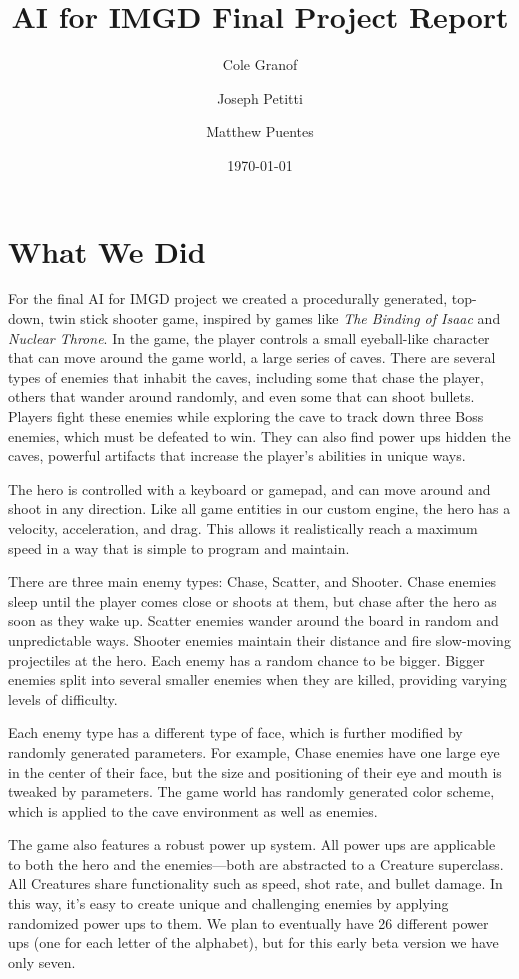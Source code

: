 \documentclass[a4paper, 12pt]{article}
\title{AI for IMGD Final Project Report}
\author{Cole Granof \and Joseph Petitti \and Matthew Puentes}
\date{\today}
\begin{document}
\maketitle

\section{What We Did}

For the final AI for IMGD project we created a procedurally generated, top-down,
twin stick shooter game, inspired by games like \textit{The Binding of Isaac}
and \textit{Nuclear Throne}. In the game, the player controls a small
eyeball-like character that can move around the game world, a large series of
caves. There are several types of enemies that inhabit the caves, including some
that chase the player, others that wander around randomly, and even some that
can shoot bullets. Players fight these enemies while exploring the cave to track
down three Boss enemies, which must be defeated to win. They can also find power
ups hidden the caves, powerful artifacts that increase the player's abilities in
unique ways.

The hero is controlled with a keyboard or gamepad, and can move around and shoot
in any direction. Like all game entities in our custom engine, the hero has a
velocity, acceleration, and drag. This allows it realistically reach a maximum
speed in a way that is simple to program and maintain.

There are three main enemy types: Chase, Scatter, and Shooter. Chase enemies
sleep until the player comes close or shoots at them, but chase after the hero
as soon as they wake up. Scatter enemies wander around the board in random and
unpredictable ways. Shooter enemies maintain their distance and fire slow-moving
projectiles at the hero. Each enemy has a random chance to be bigger. Bigger
enemies split into several smaller enemies when they are killed, providing
varying levels of difficulty.

Each enemy type has a different type of face, which is further modified by
randomly generated parameters. For example, Chase enemies have one large eye in
the center of their face, but the size and positioning of their eye and mouth is
tweaked by parameters. The game world has randomly generated color scheme, which
is applied to the cave environment as well as enemies.

The game also features a robust power up system. All power ups are applicable to
both the hero and the enemies---both are abstracted to a Creature superclass.
All Creatures share functionality such as speed, shot rate, and bullet damage.
In this way, it's easy to create unique and challenging enemies by applying
randomized power ups to them. We plan to eventually have 26 different power
ups (one for each letter of the alphabet), but for this early beta version we
have only seven.
\end{document}
